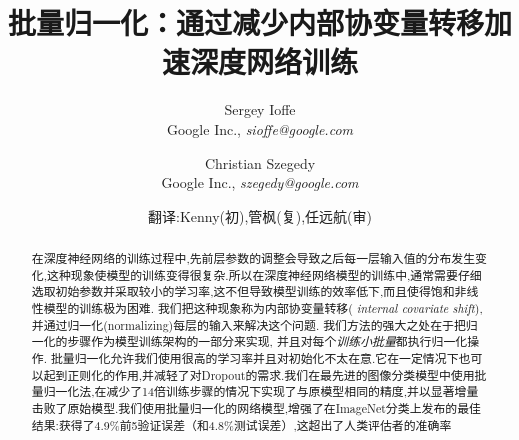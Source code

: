 \documentclass[twocolumn]{article}
\begin{document}
\newcommand{\jac}[2]{\frac{\partial #1}{\partial #2}}
\newcommand{\xhat}{\widehat{x}}
\newcommand{\yhat}{\widehat{y}}
\newcommand{\zhat}{\widehat{z}}
\newcommand{\vxhat}{\widehat\mathrm{x}}
\newcommand{\vzhat}{\widehat\mathrm{z}}
\newcommand{\setX}{\mathcal{X}}
\newcommand{\setB}{\mathcal{B}}
\newcommand{\E}{\text{E}}
\newcommand{\Var}{\text{Var}}
\newcommand{\Cov}{\text{Cov}}
\newcommand{\Fhat}{\widehat{F}}
\newcommand{\Thetahat}{\widehat{\Theta}}
\newcommand{\Norm}{\text{Norm}}
\newcommand{\BatchNorm}{\text{BN}}
\newcommand{\kk}{{(k)}}
\newcommand{\vx}{\mathrm{x}}
\newcommand{\vy}{\mathrm{y}}
\newcommand{\vz}{\mathrm{z}}
\newcommand{\vb}{\mathrm{b}}
\newcommand{\vu}{\mathrm{u}}
\newcommand{\comt}{// }
\renewcommand{\algorithmiccomment}[1]{\comt #1}
\newcommand{\BN}[2]{\text{BN}_{#2}(#1)}
\renewcommand{\algorithmicrequire}{\textbf{Input:}}
\renewcommand{\algorithmicensure}{\textbf{Output:}}
\newcommand{\mils}{\cdot 10^6}
\newcommand{\netw}[1]{{\sl #1}}
\newcommand{\norig}{\text{\sl N}}
\newcommand{\ntrain}{\norig_\mathrm{BN}^\mathrm{tr}}
\newcommand{\ninf}{\norig_\mathrm{BN}^\mathrm{inf}}
\renewcommand{\cite}[1]{\citep{#1}}


\title{批量归一化：通过减少内部协变量转移加速深度网络训练}

\author{Sergey Ioffe \\Google Inc., {\sl sioffe@google.com} \and
Christian Szegedy \\Google Inc., {\sl szegedy@google.com} \and 翻译:Kenny(初),管枫(复),任远航(审)
}

\date{}

\maketitle

\begin{abstract}

在深度神经网络的训练过程中,先前层参数的调整会导致之后每一层输入值的分布发生变化,这种现象使模型的训练变得很复杂.所以在深度神经网络模型的训练中,通常需要仔细选取初始参数并采取较小的学习率,这不但导致模型训练的效率低下,而且使得饱和非线性模型的训练极为困难. 我们把这种现象称为内部协变量转移({\em
  internal covariate shift}),并通过归一化(normalizing)每层的输入来解决这个问题.  
我们方法的强大之处在于把归一化的步骤作为模型训练架构的一部分来实现, 并且对每个{\em 训练小批量}都执行归一化操作.
批量归一化允许我们使用很高的学习率并且对初始化不太在意.它在一定情况下也可以起到正则化的作用,并减轻了对Dropout的需求.我们在最先进的图像分类模型中使用批量归一化法,在减少了14倍训练步骤的情况下实现了与原模型相同的精度,并以显著增量击败了原始模型.我们使用批量归一化的网络模型,增强了在ImageNet分类上发布的最佳结果:获得了4.9\%前5验证误差（和4.8\%测试误差）,这超出了人类评估者的准确率
\end{abstract}
\end{document}
